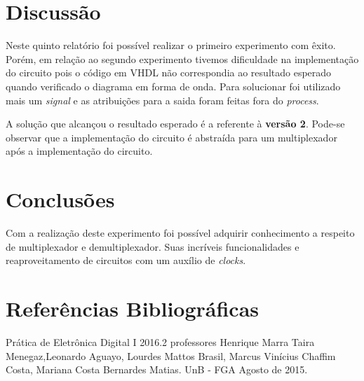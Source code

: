 \documentclass[12pts]{article}
\begin{document}
\section{Discussão}
\iffalse
Discussão sobre os resultados encontrados, comentando detalhadamente as medições realizadas e dando a devida interpretação destas, informando se os objetivos da experimento foram alcançados. Esta é uma das partes mais importantes do relatório: aqui, há oportunidade para expressar os conhecimentos adquiridos na prática e fazer a interrelação com os fundamentos teóricos.
\fi

        Neste quinto relatório foi possível realizar o primeiro experimento com êxito. Porém, em relação ao segundo experimento tivemos dificuldade na implementação do circuito pois o código em VHDL não correspondia ao resultado esperado quando verificado o diagrama em forma de onda. Para solucionar foi utilizado mais um \textit{signal} e as atribuições para a saida foram feitas fora do \textit{process}.
        
        A solução que alcançou o resultado esperado é a referente à \textbf{versão 2}. Pode-se observar que a implementação do circuito é abstraída para um multiplexador após a implementação do circuito.

\section{Conclusões}
\iffalse
Conclusões, mostrando os êxitos e eventuais problemas encontrados na realização do experimento, indicando as limitações, apresentando recomendações e/ou sugestões.
\fi

Com a realização deste experimento foi possível adquirir conhecimento a respeito de multiplexador e demultiplexador. Suas incríveis funcionalidades e reaproveitamento de circuitos com um auxílio de \textit{clocks}.

\section{Referências Bibliográficas}
\iffalse
Referencias Bibliográficas, relacionadas e citadas de acordo com as normas da ABNT.
\fi
Prática de Eletrônica Digital I 2016.2 professores Henrique Marra Taira Menegaz,Leonardo Aguayo, Lourdes Mattos Brasil, Marcus Vinícius Chaffim Costa, Mariana Costa Bernardes Matias. UnB - FGA Agosto de 2015.

\iffalse
\section{Diagramas Esquemáticos}
Diagramas Esquemáticos. Todos os diagramas devem ser inseridos ao final do relatório em páginas separadas do texto, indicando a identificação do circuito, autor, revisor, versão e datas relevantes.
\fi
\newpage
\end{document}
